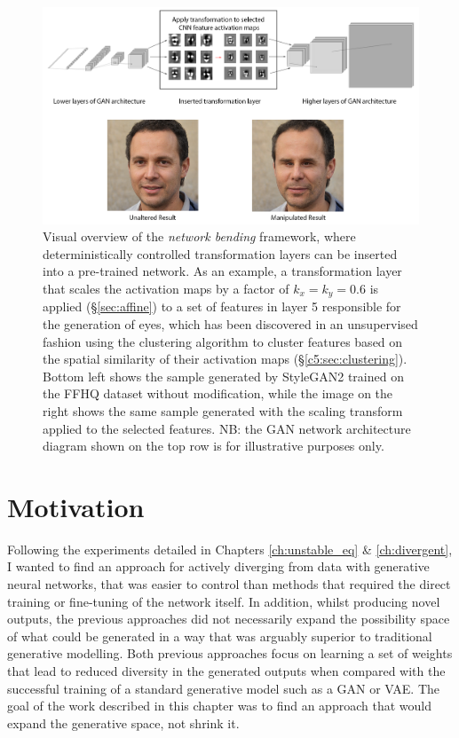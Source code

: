 \begin{figure}[!htb]
    \centering
    \includegraphics[width=1\textwidth]{figures/c5_netbend/misc/network-bending-diagram.png}
    \caption[Visual overview of the \textit{network bending} framework]{Visual overview of the \textit{network bending} framework, where deterministically controlled transformation layers can be inserted into a pre-trained network. As an example, a transformation layer that scales the activation maps by a factor of $k_x=k_y=0.6$ is applied (\S \ref{sec:affine}) to a set of features in layer 5 responsible for the generation of eyes, which has been discovered in an unsupervised fashion using the clustering algorithm to cluster features based on the spatial similarity of their activation maps (\S \ref{c5:sec:clustering}). Bottom left shows the sample generated by StyleGAN2 \citep{karras2019analyzing} trained on the FFHQ dataset without modification, while the image on the right shows the same sample generated with the scaling transform applied to the selected features. NB: the GAN network architecture diagram shown on the top row is for illustrative purposes only.}
    \label{fig:c5:overview_diagram}
\end{figure}

\section{Motivation}

Following the experiments detailed in Chapters \ref{ch:unstable_eq} \& \ref{ch:divergent}, I wanted to find an approach for actively diverging from data with generative neural networks, that was easier to control than methods that required the direct training or fine-tuning of the network itself.
In addition, whilst producing novel outputs, the previous approaches did not necessarily expand the possibility space of what could be generated in a way that was arguably superior to traditional generative modelling.
Both previous approaches focus on learning a set of weights that lead to reduced diversity in the generated outputs when compared with the successful training of a standard generative model such as a GAN or VAE.
The goal of the work described in this chapter was to find an approach that would expand the generative space, not shrink it. 


